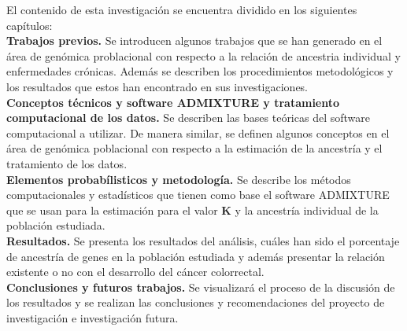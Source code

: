 El contenido de esta investigación se encuentra dividido en los siguientes cap\'itulos:\\

\textbf{Trabajos previos.} Se introducen algunos trabajos que se han generado en el \'area de gen\'omica problacional con respecto a la relaci\'on de ancestria individual y enfermedades cr\'onicas. Adem\'as se describen los procedimientos metodol\'ogicos y los resultados que estos han encontrado en sus investigaciones. \\

\textbf{Conceptos t\'ecnicos y software ADMIXTURE y tratamiento computacional de los datos.} Se describen las bases teóricas del software computacional a utilizar. De manera similar, se definen algunos conceptos en el \'area de gen\'omica poblacional con respecto a la estimaci\'on de la ancestr\'ia y el tratamiento de los datos.\\ 

\textbf{Elementos probab\'ilisticos y metodolog\'ia.} Se describe los m\'etodos computacionales y estad\'isticos que tienen como base el software ADMIXTURE que se usan para la estimaci\'on para el valor \textbf{K} y la ancestr\'ia individual de la poblaci\'on estudiada. \\

\textbf{Resultados.} Se presenta los resultados del análisis, cuáles han sido el porcentaje de ancestría de genes en la población estudiada y además presentar la relación existente o no con el desarrollo del cáncer colorrectal.\\

\textbf{Conclusiones y futuros trabajos.} Se visualizará el proceso de la discusión de los resultados y se realizan las conclusiones y recomendaciones del proyecto de investigación e investigaci\'on futura.\\





